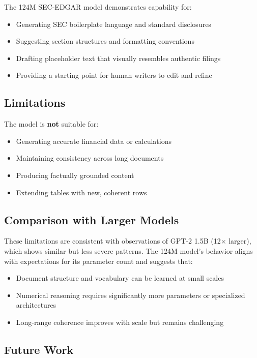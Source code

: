 \documentclass[12pt]{article}
\begin{document}
The 124M SEC-EDGAR model demonstrates capability for:
\begin{itemize}
    \item Generating SEC boilerplate language and standard disclosures
    \item Suggesting section structures and formatting conventions
    \item Drafting placeholder text that visually resembles authentic filings
    \item Providing a starting point for human writers to edit and refine
\end{itemize}

\subsection{Limitations}

The model is \textbf{not} suitable for:
\begin{itemize}
    \item Generating accurate financial data or calculations
    \item Maintaining consistency across long documents
    \item Producing factually grounded content
    \item Extending tables with new, coherent rows
\end{itemize}

\subsection{Comparison with Larger Models}

These limitations are consistent with observations of GPT-2 1.5B (12$\times$ larger), which shows similar but less severe patterns. The 124M model's behavior aligns with expectations for its parameter count and suggests that:
\begin{itemize}
    \item Document structure and vocabulary can be learned at small scales
    \item Numerical reasoning requires significantly more parameters or specialized architectures
    \item Long-range coherence improves with scale but remains challenging
\end{itemize}

\subsection{Future Work}
\end{document}
